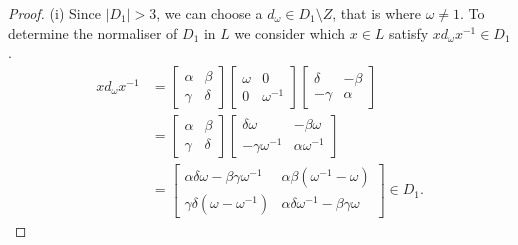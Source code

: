 \begin{proof} (i) Since $|D_1| > 3$, we can choose a $d_\omega \in D_1 \! \setminus \! Z$, that is where $\omega \neq 1$. To determine the normaliser of $D_1$ in $L$ we consider which $x \in L$ satisfy $x d_\omega x^{-1} \in D_1$.
\begin{align}\label{6.3proof3} xd_\omega x^{-1} &= \begin{bmatrix} \alpha & \beta \\ \gamma & \delta \end{bmatrix} \begin{bmatrix} \omega & 0 \\ 0 & \omega^{-1} \end{bmatrix} \begin{bmatrix} \delta & \minus \beta \\ \minus \gamma & \alpha \end{bmatrix} \nonumber \\[1.5ex]
&= \begin{bmatrix} \alpha & \beta \\ \gamma & \delta \end{bmatrix} \begin{bmatrix} \delta \omega & \minus \beta \omega \\ \minus \gamma \omega^{-1} & \alpha \omega^{-1} \end{bmatrix} \nonumber \\[1.5ex]
&= \begin{bmatrix} \alpha \delta \omega - \beta \gamma \omega^{-1} & \alpha \beta (\omega^{-1} - \omega) \\ \gamma \delta (\omega - \omega^{-1}) & \alpha \delta \omega^{-1} - \beta \gamma \omega \end{bmatrix} \in D_1.
\end{align}


\end{proof}
